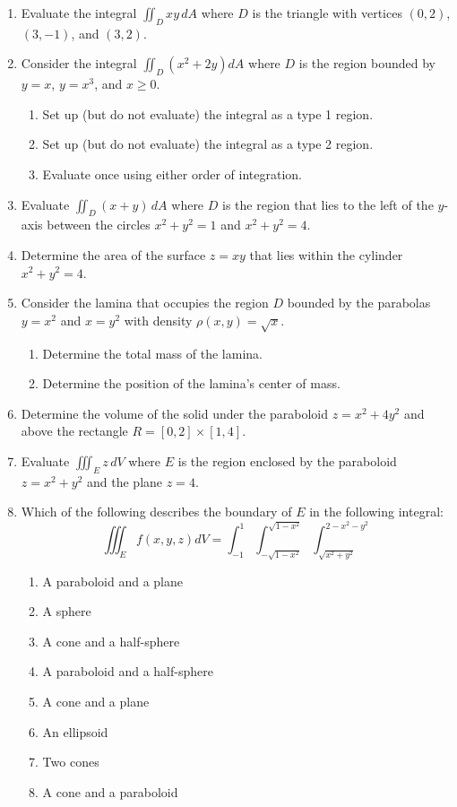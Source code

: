 \documentclass[letterpaper,12pt,fleqn]{article}
\newcommand{\p}{\rho}
\begin{document}
\begin{enumerate}
\item Evaluate the integral \(\displaystyle\iint_Dxy\,dA\) where \(D\) is the triangle with vertices
  \((0,2)\), \((3,-1)\), and \((3,2)\).
  
\item Consider the integral \(\displaystyle\iint_D(x^2+2y)dA\) where \(D\) is the region bounded by \(y=x\),
  \(y=x^3\), and \(x\ge0\).
  \begin{enumerate}
  \item Set up (but do not evaluate) the integral as a type 1 region.
  \item Set up (but do not evaluate) the integral as a type 2 region.
  \item Evaluate once using either order of integration.
  \end{enumerate}
  
\item Evaluate \(\displaystyle\iint_D(x+y)\,dA\) where \(D\) is the region that lies to the left of the \(y\)-axis
  between the circles \(x^2+y^2=1\) and \(x^2+y^2=4\).

\item Determine the area of the surface \(z=xy\) that lies within the cylinder \(x^2+y^2=4\).

\item Consider the lamina that occupies the region \(D\) bounded by the parabolas \(y=x^2\) and \(x=y^2\) with
  density \(\p(x,y)=\sqrt{x}\).
  \begin{enumerate}
  \item Determine the total mass of the lamina.
  \item Determine the position of the lamina's center of mass.
  \end{enumerate}

\item Determine the volume of the solid under the paraboloid \(z=x^2+4y^2\) and above the rectangle
  \(R=[0,2]\times[1,4]\).

\item Evaluate \(\displaystyle\iiint_Ez\,dV\) where \(E\) is the region enclosed by the paraboloid \(z=x^2+y^2\)
  and the plane \(z=4\).

\item Which of the following describes the boundary of \(E\) in the following integral:
  \[\iiint_Ef(x,y,z)dV=\int_{-1}^1\int_{-\sqrt{1-x^2}}^{\sqrt{1-x^2}}\int_{\sqrt{x^2+y^2}}^{2-x^2-y^2}\]
  \begin{enumerate}
  \item A paraboloid and a plane
  \item A sphere
  \item A cone and a half-sphere
  \item A paraboloid and a half-sphere
  \item A cone and a plane
  \item An ellipsoid
  \item Two cones
  \item A cone and a paraboloid
  \end{enumerate}


\end{enumerate}
\end{document}
